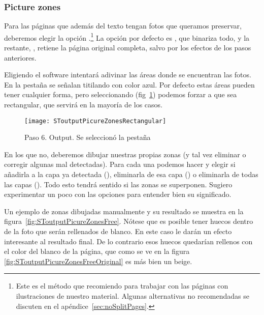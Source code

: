 \documentclass[%
	a5paper,
	10pt,
	twoside,
	openright,
	final,
]{memoir}
\begin{document}
{	\subsubsection{Picture zones\label{sec:SToutputPictureZones}}

	Para las páginas que además del texto tengan fotos que queramos preservar, deberemos elegir la opción .\footnote{Este es el método que recomiendo para trabajar con las páginas con ilustraciones de nuestro material. Algunas alternativas no recomendadas se discuten en el apéndice~\ref{sec:noSplitPages}.} La opción por defecto es , que binariza todo, y la restante, , retiene la página original completa, salvo por los efectos de los pasos anteriores.

	Eligiendo  el software intentará adivinar las áreas donde se encuentran las fotos. En la pestaña  se señalan titilando con color azul. Por defecto estas áreas pueden tener cualquier forma, pero seleccionando  (fig~\ref{fig:SToutputPicureZonesRectangular}) podemos forzar a que sea rectangular, que servirá en la mayoría de los casos.

	\begin{figure}
		\centering
		\texttt{[image: SToutputPicureZonesRectangular]}
		\caption[Paso 6. Output]{Paso 6. Output. Se seleccionó la pestaña \label{fig:SToutputPicureZonesRectangular}}
	\end{figure}

	En los que no, deberemos dibujar nuestras propias zonas (y tal vez eliminar o corregir algunas mal detectadas). Para cada una podemos hacer  y elegir si añadirla a la capa ya detectada (), eliminarla de esa capa () o eliminarla de todas las capas (). Todo esto tendrá sentido si las zonas se superponen. Sugiero experimentar un poco con las opciones para entender bien su significado.

	Un ejemplo de zonas dibujadas manualmente y su resultado se muestra en la figura~\ref{fig:SToutputPicureZonesFree}. Nótese que es posible tener huecos dentro de la foto que serán rellenados de blanco. En este caso le darán un efecto interesante al resultado final. De lo contrario esos huecos quedarían rellenos con el color del blanco de la página, que como se ve en la figura \ref{fig:SToutputPicureZonesFreeOriginal} es más bien un beige.

}
\end{document}
